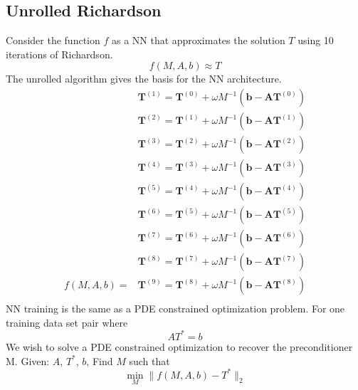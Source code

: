 \documentclass[12pt]{article}
\begin{document}
\subsection*{Unrolled Richardson }
Consider the function $f$ as a NN that approximates the solution $T$ using 10 iterations of Richardson.
\[
    f(M,A,b) \approx T
\]
The unrolled algorithm gives the basis for the NN architecture.
\[\begin{split}
                 & \mathbf{T}^{(1)} = \mathbf{T}^{(0)} + \omega M^{-1} \left(  \mathbf{b} - \mathbf{A} \mathbf{T}^{(0)}\right) \\
                 & \mathbf{T}^{(2)} = \mathbf{T}^{(1)} + \omega M^{-1} \left(  \mathbf{b} - \mathbf{A} \mathbf{T}^{(1)}\right) \\
                 & \mathbf{T}^{(3)} = \mathbf{T}^{(2)} + \omega M^{-1} \left(  \mathbf{b} - \mathbf{A} \mathbf{T}^{(2)}\right) \\
                 & \mathbf{T}^{(4)} = \mathbf{T}^{(3)} + \omega M^{-1} \left(  \mathbf{b} - \mathbf{A} \mathbf{T}^{(3)}\right) \\
                 & \mathbf{T}^{(5)} = \mathbf{T}^{(4)} + \omega M^{-1} \left(  \mathbf{b} - \mathbf{A} \mathbf{T}^{(4)}\right) \\
                 & \mathbf{T}^{(6)} = \mathbf{T}^{(5)} + \omega M^{-1} \left(  \mathbf{b} - \mathbf{A} \mathbf{T}^{(5)}\right) \\
                 & \mathbf{T}^{(7)} = \mathbf{T}^{(6)} + \omega M^{-1} \left(  \mathbf{b} - \mathbf{A} \mathbf{T}^{(6)}\right) \\
                 & \mathbf{T}^{(8)} = \mathbf{T}^{(7)} + \omega M^{-1} \left(  \mathbf{b} - \mathbf{A} \mathbf{T}^{(7)}\right) \\
    f(M,A,b)  =  & \mathbf{T}^{(9)} = \mathbf{T}^{(8)} + \omega M^{-1} \left(  \mathbf{b} - \mathbf{A} \mathbf{T}^{(8)}\right) \\
\end{split}
\]
NN training is the same as a PDE constrained optimization problem.
For one training data set pair where
\[
A T^* = b
\]
We wish to solve a PDE constrained optimization to recover the preconditioner M.
Given: $A$, $T^*$, $b$, Find $M$ such that
\[
 \min_M \| f(M,A,b) - T^*\|_2
\]
\end{document}

